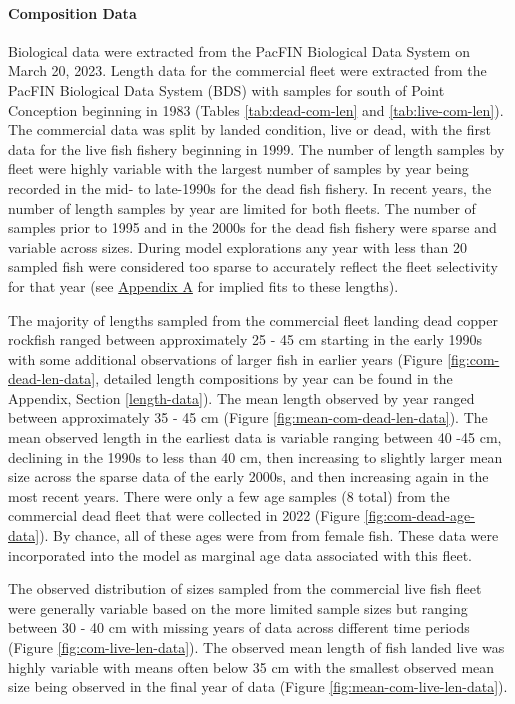 \documentclass[11pt,
  english,
  letterpaper,
]{article}
\begin{document}
\hypertarget{composition-data}{%
\paragraph{Composition Data}\label{composition-data}}

\hfill\break

Biological data were extracted from the PacFIN Biological Data System on March 20, 2023. Length data for the commercial fleet were extracted from the PacFIN Biological Data System (BDS) with samples for south of Point Conception beginning in 1983 (Tables \ref{tab:dead-com-len} and \ref{tab:live-com-len}). The commercial data was split by landed condition, live or dead, with the first data for the live fish fishery beginning in 1999. The number of length samples by fleet were highly variable with the largest number of samples by year being recorded in the mid- to late-1990s for the dead fish fishery. In recent years, the number of length samples by year are limited for both fleets. The number of samples prior to 1995 and in the 2000s for the dead fish fishery were sparse and variable across sizes. During model explorations any year with less than 20 sampled fish were considered too sparse to accurately reflect the fleet selectivity for that year (see \protect\hyperlink{excluded-data}{Appendix A} for implied fits to these lengths).

The majority of lengths sampled from the commercial fleet landing dead copper rockfish ranged between approximately 25 - 45 cm starting in the early 1990s with some additional observations of larger fish in earlier years (Figure \ref{fig:com-dead-len-data}, detailed length compositions by year can be found in the Appendix, Section \ref{length-data}). The mean length observed by year ranged between approximately 35 - 45 cm (Figure \ref{fig:mean-com-dead-len-data}). The mean observed length in the earliest data is variable ranging between 40 -45 cm, declining in the 1990s to less than 40 cm, then increasing to slightly larger mean size across the sparse data of the early 2000s, and then increasing again in the most recent years. There were only a few age samples (8 total) from the commercial dead fleet that were collected in 2022 (Figure \ref{fig:com-dead-age-data}). By chance, all of these ages were from from female fish. These data were incorporated into the model as marginal age data associated with this fleet.

The observed distribution of sizes sampled from the commercial live fish fleet were generally variable based on the more limited sample sizes but ranging between 30 - 40 cm with missing years of data across different time periods (Figure \ref{fig:com-live-len-data}). The observed mean length of fish landed live was highly variable with means often below 35 cm with the smallest observed mean size being observed in the final year of data (Figure \ref{fig:mean-com-live-len-data}).
\end{document}
